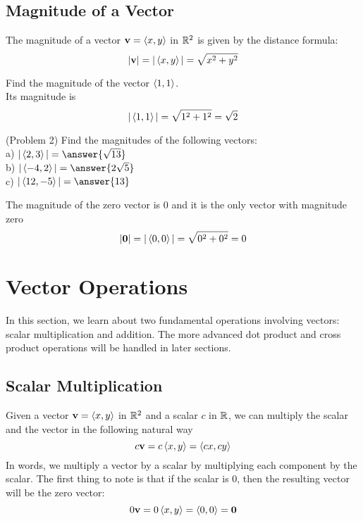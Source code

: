\documentclass[handout]{ximera}
\begin{document}
\subsection{Magnitude of a Vector}

The magnitude of a vector $\mathbf{v} = \left\langle x,y\right\rangle$ in $\mathbb R^2$ is given by the distance formula:
\[
|\mathbf{v}| = |\left\langle x,y\right\rangle| = \sqrt{x^2 +y^2}
\]

\begin{example}[Example 2]
Find the magnitude of the vector $\left\langle 1,1\right\rangle$.\\
Its magnitude is
\[
|\left\langle 1,1\right\rangle| = \sqrt{1^2 +1^2} = \sqrt 2
\]
\end{example}

\begin{problem}(Problem 2)
Find the magnitudes of the following vectors:\\
a) $|\vector{2,3}| = \answer{\sqrt{13}}$\\
b) $|\vector{-4,2}| = \answer{2\sqrt{5}}$\\
c) $|\vector{12,-5}| = \answer{13}$
\end{problem}

The magnitude of the zero vector is $0$ and it is the only vector with magnitude zero
\[
|\mathbf{0}| = |\left\langle 0,0\right\rangle| = \sqrt{0^2 +0^2} = 0
\]

\section{Vector Operations}
In this section, we learn about two fundamental operations involving vectors: scalar multiplication and addition.
The more advanced dot product and cross product operations will be handled in later sections.

\subsection{Scalar Multiplication}
Given a vector $\mathbf{v} = \left\langle x,y\right\rangle$ in $\mathbb R^2$ and a scalar $c$ in $\mathbb R$, we can multiply the scalar and the vector in the following
natural way
\[
c\mathbf{v} = c\left\langle x,y\right\rangle = \left\langle cx,cy\right\rangle
\]
In words, we multiply a vector by a scalar by multiplying each component by the scalar.
The first thing to note is that if the scalar is 0, then the resulting vector will be the zero vector:
\[
0\mathbf{v} = 0\left\langle x,y\right\rangle = \left\langle 0,0\right\rangle = \mathbf{0}
\]
\end{document}
